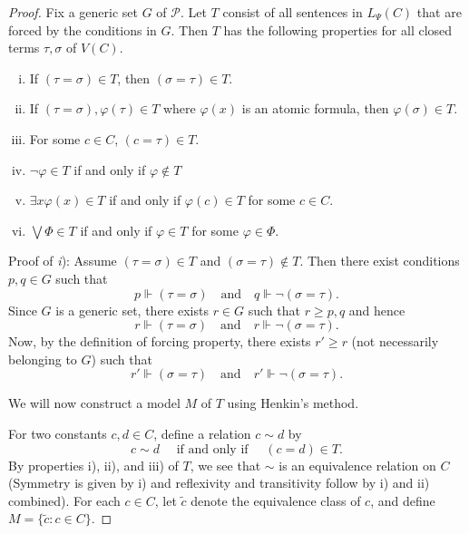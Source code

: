 \documentclass{scrartcl}
\renewcommand{\phi}{\varphi}
\begin{document}
\begin{proof}

Fix a generic set $G$ of $\mathscr{P}$. Let $T$ consist of all sentences in $L_\Psi(C)$ that are forced by the conditions in $G$. Then $T$ has the following properties for all closed terms $\tau, \sigma$ of $V(C)$.

\begin{enumerate}[i)]

\item
If $(\tau = \sigma) \in T$, then $(\sigma = \tau) \in T$.

\item
If $(\tau = \sigma), \phi(\tau) \in T$ where $\phi(x)$ is an atomic formula, then $\phi(\sigma) \in T$.

\item
For some $c\in C$, $(c = \tau )\in T$.

\item
$\neg\phi\in T$ if and only if $\phi\notin T$

\item
$\exists x \phi(x) \in T$  if and only if $\phi(c)\in T$ for some $ c \in C$.

\item
$\bigvee \Phi \in T$  if and only if $\phi\in T$ for some $\phi\in \Phi$.

\end{enumerate}

Proof of \emph{i}): Assume $(\tau=\sigma)\in T$ and $(\sigma=\tau)\notin T$. Then there exist conditions $p,q\in G$ such that
\[
p\Vdash(\tau=\sigma) \quad \text{and} \quad q\Vdash\neg(\sigma=\tau).
\]
Since $G$ is a generic set, there exists $r\in G$ such that $r \ge p, q$ and hence
\[
r\Vdash(\tau=\sigma) \quad \text{and} \quad r\Vdash \neg(\sigma=\tau).
\]
Now, by the definition of forcing property, there exists $r'\geq r$ (not necessarily belonging to $G$) such that
\[
r'\Vdash(\sigma=\tau) \quad \text{and} \quad r'\Vdash \neg(\sigma=\tau).
\]

We will now construct a model $M$ of $T$ using Henkin's method.

For two constants $c,d\in C$, define a relation $c\sim d$ by
\[
c\sim d \quad \text{ if and only if } \quad (c=d)\in T.
\]
By properties i), ii), and iii) of $T$, we see that $\sim$ is an equivalence relation on $C$ (Symmetry is given by i) and reflexivity and transitivity follow by i) and ii) combined). For each $c\in C$, let $\tilde{c}$ denote the equivalence class of $c$, and define
$M = \{\tilde{c}:c\in C\}$.


\end{proof}
\end{document}

